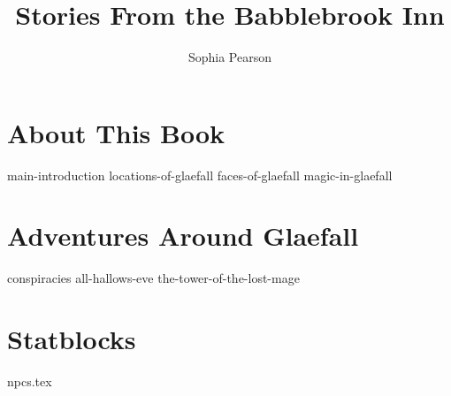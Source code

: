 \documentclass[9pt,twoside,openany]{extbook}
\title{Stories From the Babblebrook Inn}
\author{Sophia Pearson}
\begin{document}
\frontmatter

\maketitle


\tableofcontents

\mainmatter

\part{About This Book}

{main-introduction}
{locations-of-glaefall}
{faces-of-glaefall}
{magic-in-glaefall}

\part{Adventures Around Glaefall}

{conspiracies}
{all-hallows-eve}
{the-tower-of-the-lost-mage}

\part{Statblocks}

{npcs.tex}
\end{document}
